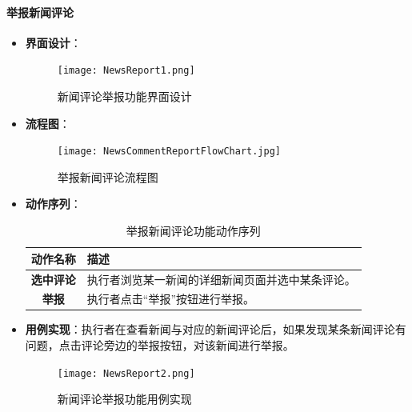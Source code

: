 \paragraph{举报新闻评论}
\begin{itemize}
	\item \textbf{界面设计}：

	\begin{figure}[H]
		\centering
		\texttt{[image: NewsReport1.png]}
		\caption{新闻评论举报功能界面设计}
		\label{fig:news-report.png}
	\end{figure}

	\item \textbf{流程图}：
	\begin{figure}[H]
		\centering
		\texttt{[image: NewsCommentReportFlowChart.jpg]}
		\caption{举报新闻评论流程图}
		\label{NewsCommentReportFlowChart}
	\end{figure}
	\item \textbf{动作序列}：
	\begin{table}[H]
		\centering
		\caption{举报新闻评论功能动作序列}
		\renewcommand\arraystretch{1.5}
		\begin{tabular}{|c|>{\raggedright\arraybackslash}p{10cm}|}
			\hline
			\textbf{动作名称} & \textbf{描述} \\ \hline
			\textbf{选中评论} & 执行者浏览某一新闻的详细新闻页面并选中某条评论。 \\ \hline
			\textbf{举报} & 执行者点击“举报”按钮进行举报。 \\ \hline
		\end{tabular}
	\end{table}
	\item \textbf{用例实现}：执行者在查看新闻与对应的新闻评论后，如果发现某条新闻评论有问题，点击评论旁边的举报按钮，对该新闻进行举报。

	\begin{figure}[H]
		\centering
		\texttt{[image: NewsReport2.png]}
		\caption{新闻评论举报功能用例实现}
		\label{fig:news-report.png}
	\end{figure}


\end{itemize}
